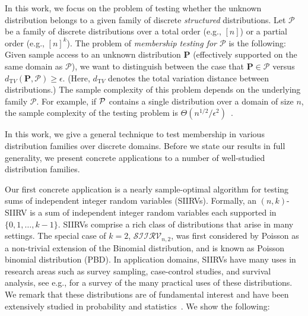 \documentclass[11pt]{article}
\makeatletter
\renewcommand{\subsection}{\@startsection{subsection}{2}{0pt}{-12pt}{-5pt}{\normalsize\bf}}
\theoremstyle{definition}
\newcommand{\p}{\mathbf{P}}
\newcommand{\dtv}{d_{\mathrm TV}}
\newcommand{\eps}{\epsilon}
\newcommand{\classksiirv}[2][n]{\ensuremath{\mathcal{SIIRV}_{#1,#2}}\xspace}
\makeatother
\begin{document}
In this work, we focus on the problem of testing whether the unknown distribution
belongs to a given family of discrete {\em structured} distributions.
Let $\mathcal{P}$ be a family of discrete distributions over a total order (e.g., $[n]$)
or a partial order (e.g., $[n]^k$). 
The problem of {\em membership testing for $\mathcal{P}$} is the following:
Given sample access to an unknown distribution $\p$ (effectively supported 
on the same domain as $\mathcal{P}$),
we want to distinguish between the case that $\p \in \mathcal{P}$ versus $\dtv(\p, \mathcal{P}) \ge \eps$.
(Here,  $\dtv$ denotes the total variation distance between distributions.)
The sample complexity of this problem depends on the underlying family
$\mathcal{P}$. For example, if $\cal P$ contains a single distribution over a domain of size $n$,
the sample complexity of the testing problem is $\Theta(n^{1/2}/\eps^2)$~\cite{CDVV14, DKN:15}.

In this work, we give a general technique to test membership in various distribution families over discrete domains.
Before we state our results in full generality, we present concrete applications to 
a number of well-studied distribution families.

\subsection{Our Results} \label{ssec:results}

Our first concrete application is a nearly sample-optimal algorithm for testing
sums of independent integer random variables (SIIRVs). 
Formally, an $(n, k)$-SIIRV is a sum of independent integer random variables each supported
in $\{0, 1, \ldots, k-1\}$.
SIIRVs comprise a rich class of distributions that arise in many settings. The special case of $k=2$, $\classksiirv[n]{2}$,
was first considered by Poisson \cite{Poisson:37} as a non-trivial extension of the Binomial distribution,
and is known as Poisson binomial distribution (PBD). In application domains, SIIRVs have many uses in research areas
such as survey sampling, case-control studies, and survival analysis, see e.g., \cite{ChenLiu:97} for a survey of the many practical uses of these distributions.
We remark that these distributions are of fundamental interest and have been extensively 
studied in probability and statistics~\cite{Chernoff:52,Hoeffding:63,DP09, Presman:83,Kruopis:86,BHJ:92, CL10,CGS11}.
We show the following:
\end{document}
